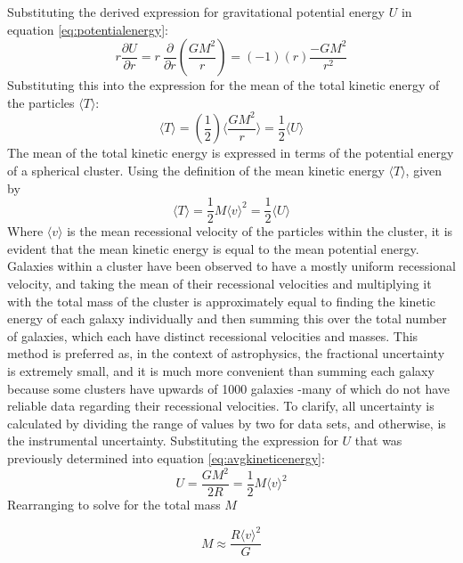 \documentclass[12pt]{article}
\begin{document}
Substituting the derived expression for gravitational potential energy $U$ in equation \ref{eq:potentialenergy}:
$$ r \frac{\partial U}{\partial r} = r \: \frac{\partial}{\partial r} (\frac{GM^2}{r}) = (-1)(r) \frac{-GM^2}{r^2}$$
Substituting this into the expression for the mean of the total kinetic energy of the particles $\langle T \rangle$:
$$ \langle T \rangle = (\frac{1}{2}) \langle \frac{GM^2}{r} \rangle = \frac{1}{2} \langle U \rangle $$ 
The mean of the total kinetic energy is expressed in terms of the potential energy of a spherical cluster. Using the definition of the mean kinetic energy $\langle T \rangle$, given by
\begin{equation}\label{eq:avgkineticenergy}
   \langle T \rangle  = \frac{1}{2} M \langle v \rangle ^2 = \frac{1}{2} \langle U \rangle
\end{equation}
Where $\langle v \rangle$ is the mean recessional velocity of the particles within the cluster, it is evident that the mean kinetic energy is equal to the mean potential energy. Galaxies within a cluster have been observed to have a mostly uniform recessional velocity, and taking the mean of their recessional velocities and multiplying it with the total mass of the cluster is approximately equal to finding the kinetic energy of each galaxy individually and then summing this over the total number of galaxies, which each have distinct recessional velocities and masses. This method is preferred as, in the context of astrophysics, the fractional uncertainty is extremely small, and it is much more convenient than summing each galaxy because some clusters have upwards of 1000 galaxies -many of which do not have reliable data regarding their recessional velocities. To clarify, all uncertainty is calculated by dividing the range of values by two for data sets, and otherwise, is the instrumental uncertainty. Substituting the expression for $U$ that was previously determined into equation \ref{eq:avgkineticenergy}:
$$ U = \frac{GM^2}{2R} = \frac{1}{2}M \langle v \rangle ^2$$
Rearranging to solve for the total mass $M$

\begin{equation} \label{eq:massofcluster}
    M \approx \frac{R \langle v \rangle^2}{G} 
\end{equation} 
\end{document}
